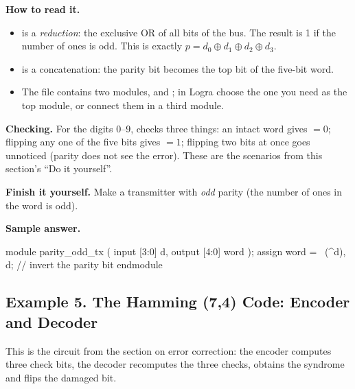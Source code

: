 
\textbf{How to read it.}
\begin{itemize}
  \item {} is a \emph{reduction}: the exclusive OR of all bits of the bus. The result is 1 if the number of ones is odd. This is exactly $p=d_0\oplus d_1\oplus d_2\oplus d_3$.
  \item {} is a concatenation: the parity bit becomes the top bit of the five-bit word.
  \item The file contains two modules,  and ; in Logra choose the one you need as the top module, or connect them in a third module.
\end{itemize}
\textbf{Checking.} For the digits 0--9,  checks three
things: an intact word gives $=0$; flipping any one of the five bits
gives $=1$; flipping two bits at once goes unnoticed (parity does not
see the error). These are the scenarios from this section's ``Do it yourself''.

\textbf{Finish it yourself.} Make a transmitter with \emph{odd} parity (the
number of ones in the word is odd).

\textbf{Sample answer.}\par\nopagebreak
\begin{vcode}
module parity_odd_tx (
    input  [3:0] d,
    output [4:0] word
);
    assign word = {~(^d), d};     // invert the parity bit
endmodule
\end{vcode}

\subsection{Example 5. The Hamming (7,4) Code: Encoder and Decoder}

This is the circuit from the section on error correction: the encoder computes
three check bits, the decoder recomputes the three checks, obtains the syndrome
and flips the damaged bit.



